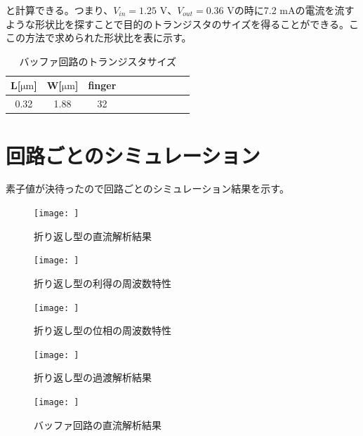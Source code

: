 \documentclass[twocolumn]{jsarticle}
\begin{document}
        と計算できる。つまり、$V_{in}=1.25$ V、$V_{out}=0.36$ Vの時に7.2 mAの電流を流すような形状比を探すことで目的のトランジスタのサイズを得ることができる。ここの方法で求められた形状比を表に示す。
        \begin{table}[H]
            \caption{バッファ回路のトランジスタサイズ}
            \label{table:buf_size}
            \centering
            \begin{tabular}{cccccccccc}
                L[$\mathrm{\mu m}$] & W[$\mathrm{\mu m}$] & finger\\
                \hline \hline
                0.32 & 1.88 & 32 \\  
            \end{tabular}
        \end{table}

\section{回路ごとのシミュレーション}
    素子値が決待ったので回路ごとのシミュレーション結果を示す。
    \begin{figure}[H]
        \begin{center}
            \texttt{[image: ]}
            \caption{折り返し型の直流解析結果}
            \label{fig:sim_NtoN_dc}
        \end{center}
    \end{figure}
    \begin{figure}[H]
        \begin{center}
            \texttt{[image: ]}
            \caption{折り返し型の利得の周波数特性}
            \label{fig:sim_NtoN_ac_gain}
        \end{center}
    \end{figure}
    \begin{figure}[H]
        \begin{center}
            \texttt{[image: ]}
            \caption{折り返し型の位相の周波数特性}
            \label{fig:sim_NtoN_ac_phase}
        \end{center}
    \end{figure}
    \begin{figure}[H]
        \begin{center}
            \texttt{[image: ]}
            \caption{折り返し型の過渡解析結果}
            \label{fig:sim_NtoN_tr}
        \end{center}
    \end{figure}
    \begin{figure}[H]
        \begin{center}
            \texttt{[image: ]}
            \caption{バッファ回路の直流解析結果}
            \label{fig:sim_buf_dc}
        \end{center}
    \end{figure}
\end{document}
